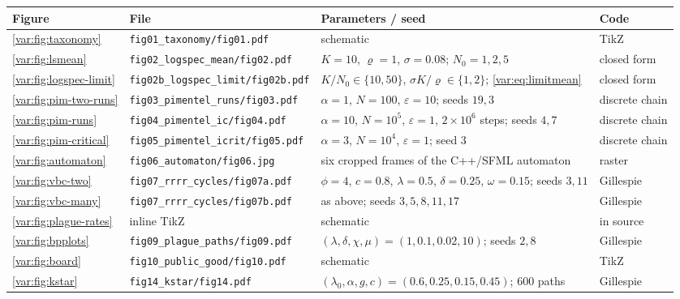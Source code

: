 \begin{table}[!htbp]
\centering
\footnotesize
\renewcommand{\arraystretch}{1.12}
\begin{tabular}{@{}l>{\raggedright\arraybackslash}p{}>{\raggedright\arraybackslash}p{}l@{}}
\toprule
Figure & File & Parameters / seed & Code \\
\midrule
\cref{var:fig:taxonomy} & \texttt{fig01\_taxonomy/fig01.pdf}
  & schematic & TikZ \\
\cref{var:fig:lsmean} & \texttt{fig02\_logspec\_mean/fig02.pdf}
  & $K=10$, $\varrho=1$, $\sigma=0.08$; $N_0=1,2,5$ & closed form \\
\cref{var:fig:logspec-limit} & \texttt{fig02b\_logspec\_\newline limit/fig02b.pdf}
  & $K/N_0\in\{10,50\}$, $\sigma K/\varrho\in\{1,2\}$;
    \cref{var:eq:limitmean} & closed form \\
\cref{var:fig:pim-two-runs} & \texttt{fig03\_pimentel\_runs/fig03.pdf}
  & $\alpha=1$, $N=100$, $\varepsilon=10$; seeds $19,3$ & discrete chain \\
\cref{var:fig:pim-runs} & \texttt{fig04\_pimentel\_ic/fig04.pdf}
  & $\alpha=10$, $N=10^{5}$, $\varepsilon=1$, $2\times10^{6}$ steps;
    seeds $4,7$ & discrete chain \\
\cref{var:fig:pim-critical} & \texttt{fig05\_pimentel\_icrit/fig05.pdf}
  & $\alpha=3$, $N=10^{4}$, $\varepsilon=1$; seed $3$ & discrete chain \\
\cref{var:fig:automaton} & \texttt{fig06\_automaton/fig06.jpg}
  & six cropped frames of the C++/SFML automaton & raster \\
\cref{var:fig:vbc-two} & \texttt{fig07\_rrrr\_cycles/fig07a.pdf}
  & $\phi=4$, $c=0.8$, $\lambda=0.5$, $\delta=0.25$, $\omega=0.15$;
    seeds $3,11$ & Gillespie \\
\cref{var:fig:vbc-many} & \texttt{fig07\_rrrr\_cycles/fig07b.pdf}
  & as above; seeds $3,5,8,11,17$ & Gillespie \\
\cref{var:fig:plague-rates} & inline TikZ
  & schematic & in source \\
\cref{var:fig:bpplots} & \texttt{fig09\_plague\_paths/fig09.pdf}
  & $(\lambda,\delta,\chi,\mu)=(1,0.1,0.02,10)$; seeds $2,8$ & Gillespie \\
\cref{var:fig:board} & \texttt{fig10\_public\_good/fig10.pdf}
  & schematic & TikZ \\
\cref{var:fig:kstar} & \texttt{fig14\_kstar/fig14.pdf}
  & $(\lambda_0,\alpha,g,c)=(0.6,0.25,0.15,0.45)$; $600$ paths & Gillespie \\

\end{tabular}
\end{table}

